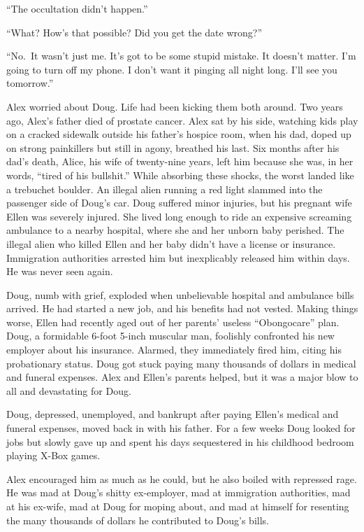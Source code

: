 ``The occultation didn't happen.''

``What? How's that possible? Did you get the date wrong?''

``No.~It wasn't just me. It's got to be some stupid mistake. It doesn't
matter. I'm going to turn off my phone. I don't want it pinging all
night long. I'll see you tomorrow.''

Alex worried about Doug. Life had been kicking them both around. Two
years ago, Alex's father died of prostate cancer. Alex sat by his side,
watching kids play on a cracked sidewalk outside his father's hospice
room, when his dad, doped up on strong painkillers but still in agony,
breathed his last. Six months after his dad's death, Alice, his wife of
twenty-nine years, left him because she was, in her words, ``tired of
his bullshit.'' While absorbing these shocks, the worst landed like a
trebuchet boulder. An illegal alien running a red light slammed into the
passenger side of Doug's car. Doug suffered minor injuries, but his
pregnant wife Ellen was severely injured. She lived long enough to ride
an expensive screaming ambulance to a nearby hospital, where she and her
unborn baby perished. The illegal alien who killed Ellen and her baby
didn't have a license or insurance. Immigration authorities arrested him
but inexplicably released him within days. He was never seen again.

Doug, numb with grief, exploded when unbelievable hospital and ambulance
bills arrived. He had started a new job, and his benefits had not
vested. Making things worse, Ellen had recently aged out of her parents'
useless ``Obongocare'' plan. Doug, a formidable 6-foot 5-inch muscular
man, foolishly confronted his new employer about his insurance. Alarmed,
they immediately fired him, citing his probationary status. Doug got
stuck paying many thousands of dollars in medical and funeral expenses.
Alex and Ellen's parents helped, but it was a major blow to all and
devastating for Doug.

Doug, depressed, unemployed, and bankrupt after paying Ellen's medical
and funeral expenses, moved back in with his father. For a few weeks
Doug looked for jobs but slowly gave up and spent his days sequestered
in his childhood bedroom playing X-Box games.

Alex encouraged him as much as he could, but he also boiled with
repressed rage. He was mad at Doug's shitty ex-employer, mad at
immigration authorities, mad at his ex-wife, mad at Doug for moping
about, and mad at himself for resenting the many thousands of dollars he
contributed to Doug's bills.

